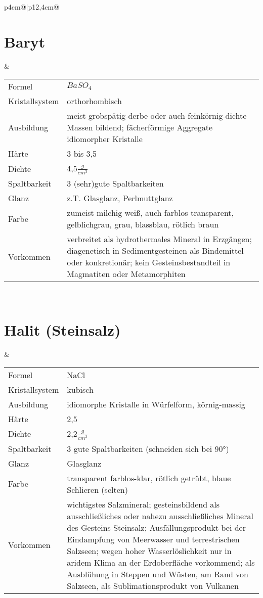 \documentclass[a4, 12pt]{scrreprt}
\begin{document}
\newpage
\begin{tabular}{p{4cm}@{}|p{}@{}}
\hline

\section{Baryt} & 
	\begin{tabular}{p{3cm}@{}p{9cm}@{}}
	Formel & $BaSO_4$\\
	Kristallsystem & orthorhombisch\\
	Ausbildung & meist grobspätig-derbe oder auch feinkörnig-dichte Massen bildend; fächerförmige Aggregate idiomorpher Kristalle\\
	Härte & 3 bis 3,5\\
	Dichte & 4,5$\frac{g}{cm^3}$\\
	Spaltbarkeit & 3 (sehr)gute Spaltbarkeiten\\
	Glanz & z.T. Glasglanz, Perlmuttglanz\\
	Farbe & zumeist milchig weiß, auch farblos transparent, gelblichgrau, grau, blassblau, rötlich braun\\
	Vorkommen & verbreitet als hydrothermales Mineral in Erzgängen; diagenetisch in Sedimentgesteinen als Bindemittel oder konkretionär; kein Gesteinsbestandteil in Magmatiten oder Metamorphiten\\
	\end{tabular}\\
\hline

\section{Halit (Steinsalz)} &
	\begin{tabular}{p{3cm}@{}p{9cm}@{}}
	Formel & NaCl\\
	Kristallsystem & kubisch\\
	Ausbildung & idiomorphe Kristalle in Würfelform, körnig-massig\\
	Härte & 2,5\\
	Dichte & 2,2$\frac{g}{cm^3}$\\
	Spaltbarkeit & 3 gute Spaltbarkeiten (schneiden sich bei 90°)\\
	Glanz & Glasglanz\\
	Farbe & transparent farblos-klar, rötlich getrübt, blaue Schlieren (selten)\\
	Vorkommen & wichtigstes Salzmineral; gesteinsbildend als ausschließliches oder nahezu ausschließliches Mineral des Gesteins Steinsalz; Ausfällungsprodukt bei der Eindampfung von Meerwasser und terrestrischen Salzseen; wegen hoher Wasserlöslichkeit nur in aridem Klima an der Erdoberfläche vorkommend; als Ausblühung in Steppen und Wüsten, am Rand von Salzseen, als Sublimationsprodukt von Vulkanen\\
	\end{tabular}\\
\hline 
\end{tabular}
\end{document}

